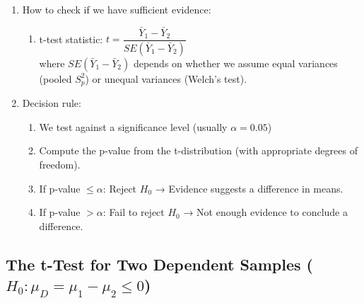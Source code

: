 \begin{enumerate}
    \item How to check if we have sufficient evidence:
    \hfill \cite{common/online/chatgpt}
    \begin{enumerate}
        \item t-test statistic: $t = \dfrac{\bar{Y}_1 - \bar{Y}_2}{SE(\bar{Y}_1 - \bar{Y}_2)}$
        \hfill \cite{common/online/chatgpt}
        \\
        where $SE(\bar{Y}_1 - \bar{Y}_2)$ depends on whether we assume equal variances (pooled $S_p^2$) or unequal variances (Welch’s test).
        \hfill \cite{common/online/chatgpt}
    \end{enumerate}

    \item Decision rule: 
    \hfill \cite{common/online/chatgpt}
    \begin{enumerate}
        \item We test against a significance level (usually $\alpha=0.05$)
        \hfill \cite{common/online/chatgpt}

        \item Compute the p-value from the t-distribution (with appropriate degrees of freedom).
        \hfill \cite{common/online/chatgpt}

        \item If p-value $\leq \alpha$: Reject $H_0$ → Evidence suggests a difference in means.
        \hfill \cite{common/online/chatgpt}

        \item If p-value $> \alpha$: Fail to reject $H_0$ → Not enough evidence to conclude a difference.
        \hfill \cite{common/online/chatgpt}
    \end{enumerate}
\end{enumerate}


\subsection{The t-Test for Two Dependent Samples ($H_0 : \mu_D = \mu_1 - \mu_2 \leq 0$)}

